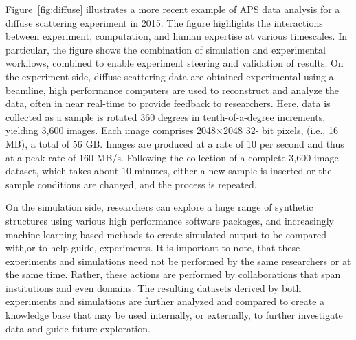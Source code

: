 \documentclass{aip-cp}
\begin{document}
Figure~\ref{fig:diffuse} illustrates a more recent example of APS data analysis
for a diffuse scattering experiment in 2015. 
The figure highlights the interactions between experiment, computation, and human expertise
at various timescales. In particular, the figure shows the combination of simulation and 
experimental workflows, combined to enable experiment steering and validation of results.
On the experiment side, diffuse scattering data are obtained experimental using a beamline, 
high performance computers are used to reconstruct and analyze the data, often in
near real-time to provide feedback to researchers.  Here, data is collected
as a sample is rotated 360 degrees in tenth-of-a-degree increments, yielding
3,600 images. Each image comprises 2048$\times$2048 32-
bit pixels, (i.e., 16 MB), a total of 56 GB. Images are
produced at a rate of 10 per second and thus at a peak rate of
160 MB/s. Following the collection of a complete 3,600-image
dataset, which takes about 10 minutes, either a new sample
is inserted or the sample conditions are changed,
and the process is repeated. 

On the simulation side, researchers can explore a huge range of synthetic structures
using various high performance software packages, and increasingly machine learning
based methods to create simulated output to be compared with,or to help guide, experiments. 
It is important to note, that these experiments and simulations need not be performed
by the same researchers or at the same time. Rather, these actions are performed by
collaborations that span institutions and even domains. 
The resulting datasets derived by both experiments and simulations are further analyzed
and compared to create a knowledge base that may be used internally, or externally, 
to further investigate data and guide future exploration.
\end{document}

